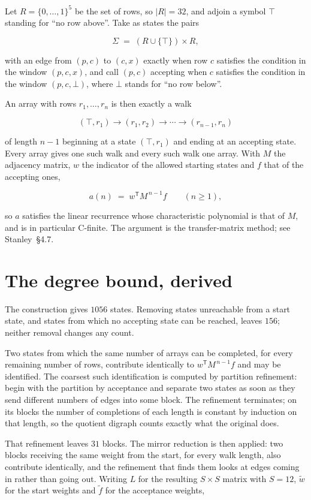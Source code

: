\documentclass[11pt]{article}
\theoremstyle{definition}
\begin{document}
Let $R = \{0,\dots,1\}^{5}$ be the set of rows, so $|R| = 32$, and adjoin a symbol $\top$ standing for ``no row above''. Take as states the pairs

\[\Sigma \;=\; (R \cup \{\top\}) \times R,\]

with an edge from $(p,c)$ to $(c,x)$ exactly when row $c$ satisfies the condition in the window $(p,c,x)$, and call $(p,c)$ accepting when $c$ satisfies the condition in the window $(p,c,\bot)$, where $\bot$ stands for ``no row below''.

An array with rows $r_1,\dots,r_n$ is then exactly a walk

\[(\top,r_1) \to (r_1,r_2) \to \cdots \to (r_{n-1},r_n)\]

of length $n-1$ beginning at a state $(\top,r_1)$ and ending at an accepting state. Every array gives one such walk and every such walk one array. With $M$ the adjacency matrix, $w$ the indicator of the allowed starting states and $f$ that of the accepting ones,

\[a(n) \;=\; w^{\mathsf T} M^{\,n-1} f \qquad (n \ge 1),\]

so $a$ satisfies the linear recurrence whose characteristic polynomial is that of $M$, and is in particular C-finite. The argument is the transfer-matrix method; see Stanley~\S4.7.

\section{The degree bound, derived}

The construction gives $1056$ states. Removing states unreachable from a start state, and states from which no accepting state can be reached, leaves $156$; neither removal changes any count.

Two states from which the same number of arrays can be completed, for every remaining number of rows, contribute identically to $w^{\mathsf T}M^{\,n-1}f$ and may be identified. The coarsest such identification is computed by partition refinement: begin with the partition by acceptance and separate two states as soon as they send different numbers of edges into some block. The refinement terminates; on its blocks the number of completions of each length is constant by induction on that length, so the quotient digraph counts exactly what the original does.

That refinement leaves $31$ blocks. The mirror reduction is then applied: two blocks receiving the same weight from the start, for every walk length, also contribute identically, and the refinement that finds them looks at edges coming in rather than going out. Writing $L$ for the resulting $S \times S$ matrix with $S = 12$, $\tilde w$ for the start weights and $\tilde f$ for the acceptance weights,
\end{document}
